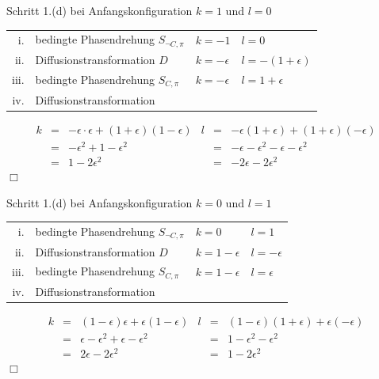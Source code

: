              \begin{lemma} Schritt 1.(d) bei Anfangskonfiguration $k=1$ und $l=0$
             \end{lemma}
             \begin{tabular}{rlll}
               i.    & bedingte Phasendrehung $S_{\neg C,\pi}$ & $k = -1$        & $l = 0$                 \\
               ii.   & Diffusionstransformation $D$            & $k = -\epsilon$ & $l = -(1+\epsilon)$     \\
               iii.  & bedingte Phasendrehung $S_{C,\pi}$      & $k = -\epsilon$ & $l = 1+\epsilon$        \\
               iv.   & Diffusionstransformation                &                 &
             \end{tabular}
             $$ 
             \begin{array}{rclrcl}
               k & = & -\epsilon \cdot \epsilon + (1 + \epsilon)(1 - \epsilon)  & l & = & -\epsilon (1 + \epsilon) + (1 + \epsilon)(-\epsilon) \\
                 & = & -\epsilon^2 + 1 -\epsilon^2                              &   & = & -\epsilon - \epsilon^2 - \epsilon - \epsilon^2 \\
                 & = & 1 - 2\epsilon^2                                          &   & = & -2\epsilon - 2\epsilon^2 
             \end{array}
             $$ \hfill $\Box$
             \begin{lemma} Schritt 1.(d) bei Anfangskonfiguration $k=0$ und $l=1$
             \end{lemma}
             \begin{tabular}{rlll}
               i.   & bedingte Phasendrehung $S_{\neg C,\pi}$ & $k = 0 $         & $l = 1$ \\
               ii.  & Diffusionstransformation $D$            & $k = 1-\epsilon$ & $l = -\epsilon$ \\
               iii. & bedingte Phasendrehung $S_{C,\pi}$      & $k = 1-\epsilon$ & $l = \epsilon$ \\
               iv.  & Diffusionstransformation                &                  &
             \end{tabular}
             $$
             \begin{array}{rclrcl}
               k & = & (1-\epsilon)\epsilon + \epsilon(1-\epsilon)       & l & = & (1 -\epsilon )(1 + \epsilon) + \epsilon(-\epsilon) \\
                 & = & \epsilon - \epsilon^2 + \epsilon - \epsilon^2     &   & = & 1 - \epsilon^2 - \epsilon^2 \\
                 & = & 2\epsilon - 2 \epsilon^2                          &   & = & 1 -2\epsilon^2
             \end{array}
             $$ \hfill $\Box$
